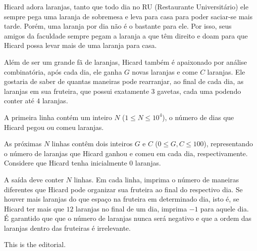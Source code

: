 Hicard adora laranjas, tanto que todo dia no RU (Restaurante Universitário) ele sempre pega uma laranja de sobremesa e leva para casa para poder saciar-se mais tarde.  
Porém, uma laranja por dia não é o bastante para ele. Por isso, seus amigos da faculdade sempre pegam a laranja a que têm direito e doam para que Hicard possa levar mais de uma laranja para casa.

Além de ser um grande fã de laranjas, Hicard também é apaixonado por análise combinatória, após cada dia, ele ganha $G$ novas laranjas e come $C$ laranjas.  
Ele gostaria de saber de quantas maneiras pode rearranjar, ao final de cada dia, as laranjas em sua fruteira, que possui exatamente $3$ gavetas, cada uma podendo conter até $4$ laranjas.

A primeira linha contém um inteiro $N$ ($1 \le N \le 10^4$), o número de dias que Hicard pegou ou comeu laranjas.

As próximas $N$ linhas contêm dois inteiros $G$ e $C$ ($0 \le G, C \le 100$), representando o número de laranjas que Hicard ganhou e comeu em cada dia, respectivamente.
Considere que Hicard tenha inicialmente $0$ laranjas.


A saída deve conter $N$ linhas.  
Em cada linha, imprima o número de maneiras diferentes que Hicard pode organizar sua fruteira ao final do respectivo dia.
Se houver mais laranjas do que espaço na fruteira em determinado dia, isto é, se Hicard ter mais que $12$ laranjas no final de um dia, imprima $-1$ para aquele dia.
É garantido que que o número de laranjas nunca será negativo e que a ordem das laranjas dentro das fruteiras é irrelevante.

This is the editorial.
